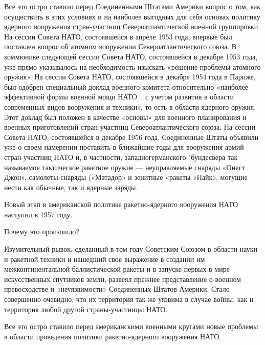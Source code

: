 \documentclass[12pt, a4paper, openany]{book}
\begin{document}
Все это остро ставило перед Соединенными Штатами Америки вопрос о том, как осуществить в этих условиях и на наиболее выгодных для себя основах политику ядерного вооружения стран-участниц Североатлантической военной группировки. На сессии Совета НАТО, состоявшейся в апреле 1953 года, впервые был поставлен вопрос об атомном вооружении Североатлантического союза. В коммюнике следующей сессии Совета НАТО, состоявшейся в декабре 1953 года, уже прямо указывалось на необходимость изыскать «решение проблемы атомного оружия». На сессии Совета НАТО, состоявшейся в декабре 1954 года в Париже, был одобрен специальный доклад военного комитета относительно «наиболее эффективной формы военной мощи НАТО... с учетом развития в области современных видов вооружения и техники», то есть в области ядерного оружия. Этот доклад был положен в качестве «основы» для военного планирования и военных приготовлений стран-участниц Североатлантического союза. На сессии Совета НАТО, состоявшейся в декабре 1956 года, Соединенные Штаты объявили уже о своем намерении поставить в ближайшие годы для вооружения армий стран-участниц НАТО и, в частности, западногерманского "бундесвера так называемое тактическое ракетное оружие — неуправляемые снаряды «Онест Джон», самолеты-снаряды («Матадор» и зенитные «ракеты «Найк», могущие нести как обычные, так и ядерные заряды.
	
Новый этап в американской политике ракетно-ядерного вооружения НАТО наступил в 1957 году.
	
Почему это произошло?
	
	
Изумительный рывок, сделанный в том году Советским Союзом в области науки и ракетной техники и нашедший свое выражение в создании им межконтинентальной баллистической ракеты и в запуске первых в мире искусственных спутников земли, развеял прежнее представление о военном превосходстве и «неуязвимости» Соединенных Штатов Америки. Стало совершенно очевидно, что их территория так же уязвима в случае войны, как и территория любой другой страны-участницы НАТО.
	
Все это остро ставило перед американскими военными кругами новые проблемы в области проведения политики ракетно-ядерного вооружения НАТО.
	
\end{document}
